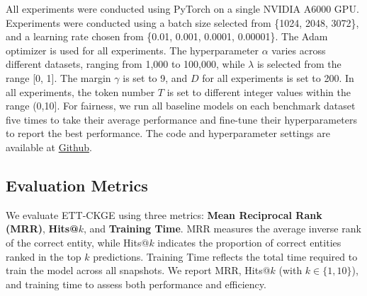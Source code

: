 \documentclass[runningheads]{llncs}
\begin{document}
All experiments were conducted using PyTorch on a single NVIDIA A6000 GPU. Experiments were conducted using a batch size selected from \{1024, 2048, 3072\}, and a learning rate chosen from \{0.01, 0.001, 0.0001, 0.00001\}. The Adam optimizer is used for all experiments. The hyperparameter $\alpha$ varies across different datasets, ranging from 1,000 to 100,000, while $\lambda$ is selected from the range [0, 1]. The margin $\gamma$ is set to 9, and $D$ for all experiments is set to 200. In all experiments, the token number $T$ is set to different integer values within the range (0,10]. For fairness, we run all baseline models on each benchmark dataset five times to take their average performance and fine-tune their hyperparameters to report the best performance. The code and hyperparameter settings are available at 
\href{https://github.com/lijingzhu1/ETT-CKGE}{Github}.



\subsection{Evaluation Metrics}

We evaluate ETT-CKGE using three metrics: \textbf{Mean Reciprocal Rank (MRR)}, \textbf{Hits@$k$}, and \textbf{Training Time}. MRR measures the average inverse rank of the correct entity, while Hits@$k$ indicates the proportion of correct entities ranked in the top $k$ predictions. Training Time reflects the total time required to train the model across all snapshots. We report MRR, Hits@$k$ (with $k \in \{1, 10\}$), and training time to assess both performance and efficiency.

\end{document}
